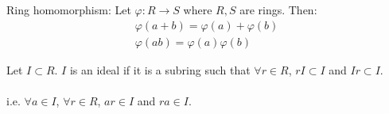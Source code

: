 \documentclass[class=scrartcl, crop=false]{standalone}
\begin{document}
\begin{definition}
  Ring homomorphism: Let $\varphi: R \to S$ where $R, S$ are rings. Then:
  \begin{gather*}
    \varphi(a + b) = \varphi(a) + \varphi(b) \\
    \varphi(ab) = \varphi(a) \varphi(b)
  \end{gather*} 
\end{definition} 

\begin{definition}[Ideal]
  Let $I \subset R$. $I$ is an ideal if it is a subring such that $\forall r \in R$, $rI \subset I$ and $Ir \subset I$.
  \\\\
  i.e. $\forall a \in I$, $\forall r \in R$, $ar \in I$ and $ra \in I$.
\end{definition} 
\end{document}
